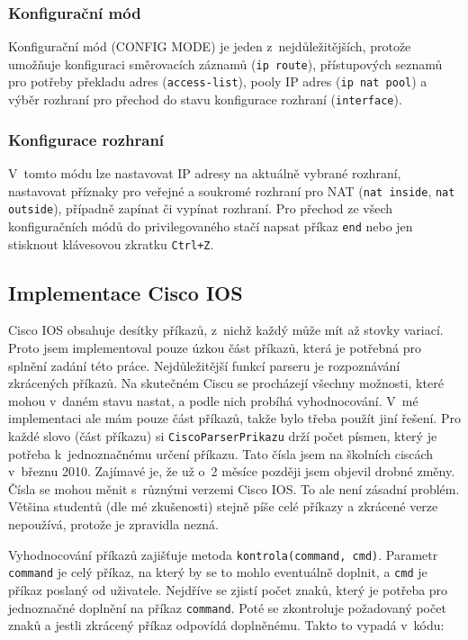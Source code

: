 \subsubsection{Konfigurační mód}
Konfigurační mód (CONFIG MODE) je jeden z~nejdůležitějších, protože umožňuje konfiguraci směrovacích záznamů (\verb|ip route|), přístupových seznamů pro potřeby překladu adres (\verb|access-list|), pooly IP adres (\verb|ip nat pool|) a výběr rozhraní pro přechod do stavu konfigurace rozhraní (\verb|interface|).

\subsubsection{Konfigurace rozhraní} \label{configif}
V~tomto módu lze nastavovat IP adresy na aktuálně vybrané rozhraní, nastavovat příznaky pro veřejné a soukromé rozhraní pro NAT (\verb|nat inside|, \verb|nat outside|), případně zapínat či vypínat rozhraní. Pro přechod ze všech konfiguračních módů do privilegovaného stačí napsat příkaz \verb|end| nebo jen stisknout klávesovou zkratku \verb|Ctrl+Z|.


\subsection{Implementace Cisco IOS}
Cisco IOS obsahuje desítky příkazů, z~nichž každý může mít až stovky variací. Proto jsem implementoval pouze úzkou část příkazů, která je potřebná pro splnění zadání této práce. Nejdůležitější funkcí parseru je rozpoznávání zkrácených příkazů. Na skutečném Ciscu se procházejí všechny možnosti, které mohou v~daném stavu nastat, a podle nich probíhá vyhodnocování. V~mé implementaci ale mám pouze část příkazů, takže bylo třeba použít jiní řešení. Pro každé slovo (část příkazu) si \verb|CiscoParserPrikazu| drží počet písmen, který je potřeba k~jednoznačnému určení příkazu. Tato čísla jsem  na školních ciscách v~březnu 2010. Zajímavé je, že už o~2 měsíce později jsem objevil drobné změny. Čísla se mohou měnit s~různými verzemi Cisco IOS. To ale není zásadní problém. Většina studentů (dle mé zkušenosti) stejně píše celé příkazy a zkrácené verze nepoužívá, protože je zpravidla nezná.

Vyhodnocování příkazů zajišťuje metoda \verb|kontrola(command, cmd)|. Parametr \verb|command| je celý příkaz, na který by se to mohlo eventuálně doplnit, a \verb|cmd| je příkaz poslaný od uživatele. Nejdříve se zjistí počet znaků, který je potřeba pro jednoznačné doplnění na příkaz \verb|command|. Poté se zkontroluje požadovaný počet znaků a jestli zkrácený příkaz odpovídá doplněnému. Takto to vypadá v~kódu:

